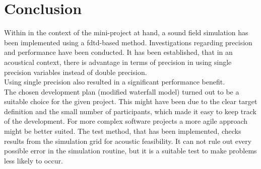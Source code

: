 \chapter{Conclusion}
Within in the context of the mini-project at hand, a sound field simulation has been implemented using a \gls{fdtd}-based method. Investigations regarding precision and performance have been conducted. It has been established, that in an acoustical context, there is advantage in terms of precision in using single precision variables instead of double precision.\\
Using single precision also resulted in a significant performance benefit.\\
The chosen development plan (modified waterfall model) turned out to be a suitable choice for the given project. This might have been due to the clear target definition and the small number of participants, which made it easy to keep track of the development. For more complex software projects a more agile approach might be better suited.
The test method, that has been implemented, checks results from the simulation grid for acoustic feasibility. It can not rule out every possible error in the simulation routine, but it is a suitable test to make problems less likely to occur.